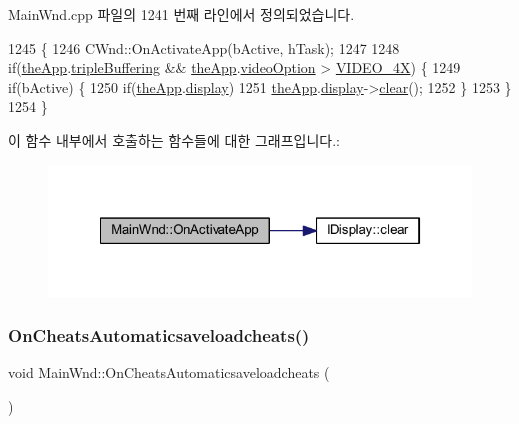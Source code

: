 Main\+Wnd.\+cpp 파일의 1241 번째 라인에서 정의되었습니다.


\begin{DoxyCode}
1245 \{
1246   CWnd::OnActivateApp(bActive, hTask);
1247   
1248   \textcolor{keywordflow}{if}(\mbox{\hyperlink{_v_b_a_8cpp_a8095a9d06b37a7efe3723f3218ad8fb3}{theApp}}.\mbox{\hyperlink{class_v_b_a_af597e2c2466efdc6365a5d725651b855}{tripleBuffering}} && \mbox{\hyperlink{_v_b_a_8cpp_a8095a9d06b37a7efe3723f3218ad8fb3}{theApp}}.\mbox{\hyperlink{class_v_b_a_a17dac073149c897f770c00ed7098ad32}{videoOption}} > 
      \mbox{\hyperlink{_v_b_a_8h_a531c35e38ede3ea4e5ba5afb24b29493a6468bce6b84e6350d3de126f257eb38d}{VIDEO\_4X}}) \{
1249     \textcolor{keywordflow}{if}(bActive) \{
1250       \textcolor{keywordflow}{if}(\mbox{\hyperlink{_v_b_a_8cpp_a8095a9d06b37a7efe3723f3218ad8fb3}{theApp}}.\mbox{\hyperlink{class_v_b_a_a940e5bad8b3ed2436888dbcd03bfd563}{display}})
1251         \mbox{\hyperlink{_v_b_a_8cpp_a8095a9d06b37a7efe3723f3218ad8fb3}{theApp}}.\mbox{\hyperlink{class_v_b_a_a940e5bad8b3ed2436888dbcd03bfd563}{display}}->\mbox{\hyperlink{class_i_display_affb8a8b5651d138058cdbd088ff3968d}{clear}}();
1252     \}
1253   \}
1254 \}
\end{DoxyCode}
이 함수 내부에서 호출하는 함수들에 대한 그래프입니다.\+:
\nopagebreak
\begin{figure}[H]
\begin{center}
\leavevmode
\includegraphics[width=322pt]{class_main_wnd_af5891778521ca0b293453e8d6be97533_cgraph}
\end{center}
\end{figure}
\mbox{\label{class_main_wnd_acf3525f8b6804fb4fcc4332d976c9961}} 
\subsubsection{\texorpdfstring{On\+Cheats\+Automaticsaveloadcheats()}{OnCheatsAutomaticsaveloadcheats()}}
{\footnotesize\ttfamily void Main\+Wnd\+::\+On\+Cheats\+Automaticsaveloadcheats (\begin{DoxyParamCaption}{ }\end{DoxyParamCaption})\hspace{0.3cm}{\ttfamily [protected]}}



